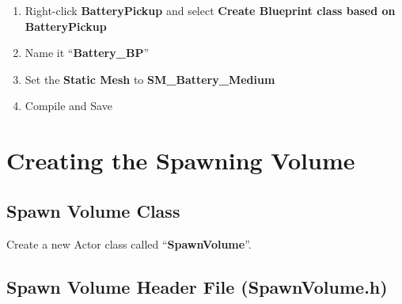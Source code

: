 \documentclass[
  letterpaper,
  DIV=11,
  numbers=noendperiod]{scrartcl}
\providecommand{\tightlist}{%
  \setlength{\itemsep}{0pt}\setlength{\parskip}{0pt}}
\begin{document}
\begin{enumerate}
\def\labelenumi{\arabic{enumi}.}
\tightlist
\item
  Right-click \textbf{BatteryPickup} and select \textbf{Create Blueprint
  class based on BatteryPickup}
\item
  Name it ``\textbf{Battery\_BP}''
\item
  Set the \textbf{Static Mesh} to \textbf{SM\_Battery\_Medium}
\item
  Compile and Save
\end{enumerate}

\section{Creating the Spawning
Volume}\label{creating-the-spawning-volume}

\subsection{Spawn Volume Class}\label{spawn-volume-class}

Create a new Actor class called ``\textbf{SpawnVolume}''.

\subsection{Spawn Volume Header File
(SpawnVolume.h)}\label{spawn-volume-header-file-spawnvolume.h}
\end{document}
